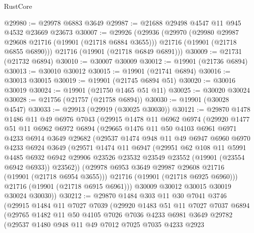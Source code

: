 \begin{lexlean}{RustCore}
\begin{coremodule}
@29980 := @29978 @6883 @3649
@29987 := @21688 @29498 @4547 @11 @945 @4532 @23669 @23673
@30007 := @29926
    (@29936
      (@29970
        (@29980 @29987 @29608 @21716 (@19901 (@21718 @6884 @3655)))
        @21716
        (@19901 (@21718 @6855 @6890)))
      @21716
      (@19901 (@21718 @6849 @6891)))
@30009 := @21731 (@21732 @6894)
@30010 := @30007 @30009
@30012 := @19901 (@21736 @6894)
@30013 := @30010 @30012
@30015 := @19901 (@21741 @6894)
@30016 := @30013 @30015
@30019 := @19901 (@21745 @6894 @51)
@30020 := @30016 @30019
@30024 := @19901 (@21750 @1465 @51 @11)
@30025 := @30020 @30024
@30028 := @21756 (@21757 (@21758 @6894))
@30030 := @19901 (@30028 @4547)
@30033 := @29913 (@29919 (@30025 @30030))
@30121 := @29870
    @1478
    @1486
    @11
    @49
    @6976
    @7043
    (@29915
      @1478
      @11
      @6962
      @6974
      (@29920
        @1477
        @51
        @11
        @6962
        @6972
        @6894
        (@29665
          @1476
          @11
          @50
          @4103
          @6961
          @6971
          @4233
          @6914
          @3649
          @29682
          (@29537
            @1474
            @948
            @11
            @49
            @6947
            @6960
            @6970
            @4233
            @6924
            @3649
            (@29571
              @1474
              @11
              @6947
              (@29951
                @62
                @108
                @11
                @5991
                @4485
                @6932
                @6942
                @29906
                @23526
                @23532
                @23549
                @23552
                (@19901 (@23554 @6942 @6933))
                @23562))
            (@29978 @6953 @3649 @29987 @29608 @21716 (@19901 (@21718 @6954 @3655)))
            @21716
            (@19901 (@21718 @6925 @6960)))
          @21716
          (@19901 (@21718 @6915 @6961)))
        @30009
        @30012
        @30015
        @30019
        @30024
        @30030))
@30212 := @29870
    @1484
    @303
    @11
    @30
    @7041
    @3746
    (@29915
      @1484
      @11
      @7027
      @7039
      (@29920
        @1483
        @51
        @11
        @7027
        @7037
        @6894
        (@29765
          @1482
          @11
          @50
          @4105
          @7026
          @7036
          @4233
          @6981
          @3649
          @29782
          (@29537
            @1480
            @948
            @11
            @49
            @7012
            @7025
            @7035
            @4233
            @2923

\end{coremodule}
\end{lexlean}
